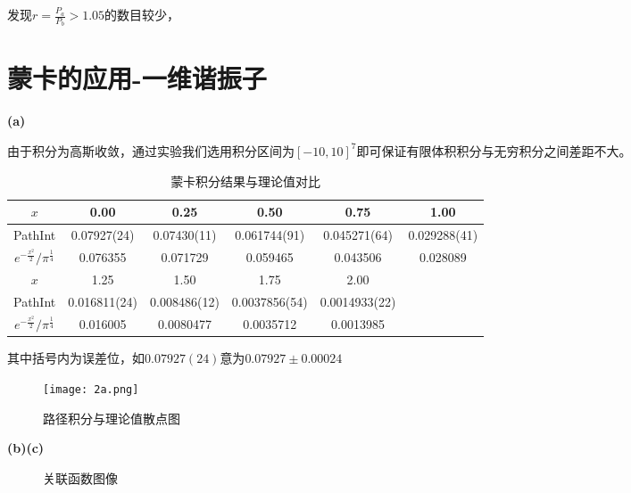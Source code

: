 \documentclass[UTF8]{ctexart}
\begin{document}
发现$r=\frac{P_a}{P_b}>1.05$的数目较少，

\section{蒙卡的应用-一维谐振子}

\noindent\textbf{(a)}

由于积分为高斯收敛，通过实验我们选用积分区间为$[-10,10]^7$即可保证有限体积积分与无穷积分之间差距不大。

\begin{table}[H]
    \centering
    \caption{蒙卡积分结果与理论值对比}
    \begin{tabular}{|c|ccccc|}
        \hline
        $x$ & 0.00 & 0.25 & 0.50 & 0.75 & 1.00 \\
        \hline
        PathInt & 0.07927(24) & 0.07430(11) & 0.061744(91) & 0.045271(64) & 0.029288(41) \\
        \cline{0-0}
        $e^{-\frac{x^2}{2}}/\pi^\frac{1}{4}$ & 0.076355 & 0.071729 & 0.059465 & 0.043506 & 0.028089 \\
        \hline
        $x$ & 1.25 & 1.50 & 1.75 &2.00 &~\\
        \hline
        PathInt& 0.016811(24) & 0.008486(12) & 0.0037856(54) & 0.0014933(22) &~\\
        \cline{0-0}
        $e^{-\frac{x^2}{2}}/\pi^\frac{1}{4}$& 0.016005 & 0.0080477 & 0.0035712 & 0.0013985 &~\\
        \hline
    \end{tabular}
\end{table}

其中括号内为误差位，如$0.07927(24)$意为$0.07927\pm 0.00024$

\begin{figure}[H]
    \centering
    \texttt{[image: 2a.png]}
    \caption{路径积分与理论值散点图}
\end{figure}

\noindent\textbf{(b)(c)}

\begin{figure}[H]
    \centering

    \caption{关联函数图像}
\end{figure}
\end{document}
